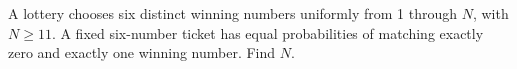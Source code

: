 A lottery chooses six distinct winning numbers uniformly from 1 through $N$, with $N\ge11$. A fixed six-number ticket has equal probabilities of matching exactly zero and exactly one winning number. Find $N$.
